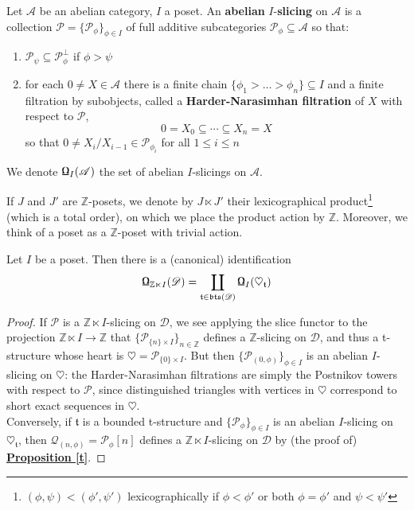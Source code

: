 \begin{defn}
Let $\mathscr{A}$ be an abelian category, $I$ a poset. An \textbf{abelian} $I$-\textbf{slicing} on $\mathscr{A}$ is a collection $\mathscr{P}=\{ \mathscr{P}_{\phi} \}_{\phi \in I}$ of full additive subcategories $\mathscr{P}_{\phi} \subseteq \mathscr{A}$ so that: 
\begin{enumerate}
\item $\mathscr{P}_{\psi} \subseteq \mathscr{P}_{\phi }^{\perp}$ if  $\phi > \psi$
\item for each $0 \not = X \in \mathscr{A}$ there is a finite chain $\{ \phi_1 > \dots > \phi_n \} \subseteq I$ and a finite filtration by subobjects, called a \textbf{Harder-Narasimhan filtration} of $X$ with respect to $\mathscr{P}$, $$0=X_0 \subseteq \cdots \subseteq X_n=X$$ so that $0 \not = X_i / X_{i-1} \in \mathscr{P}_{\phi_i}$ for all $1 \le i \le n$ 
\end{enumerate}
We denote $\textnormal{\Libra}_I(\mathscr{A})$ the set of abelian $I$-slicings on $\mathscr{A}$. 
\end{defn}

If $J$ and $J'$ are $\mathbb{Z}$-posets, we denote by $J \ltimes J'$ their lexicographical product\footnote{$(\phi,\psi) < (\phi',\psi')$ lexicographically if $\phi < \phi'$ or both $\phi=\phi'$ and $\psi < \psi'$} (which is a total order), on which we place the product action by $\mathbb{Z}$. Moreover, we think of a poset as a $\mathbb{Z}$-poset with trivial action.

\begin{prop}\label{v}
Let $I$ be a poset. Then there is a (canonical) identification  $$\textnormal{\Libra}_{\mathbb{Z} \ltimes I}(\mathscr{D})=\coprod_{\mathfrak{t} \in \mathfrak{bts}(\mathscr{D})} \textnormal{\Libra}_I(\heartsuit_{\mathfrak{t}})$$
\end{prop}

\begin{proof}
If $\mathscr{P}$ is a $\mathbb{Z} \ltimes I$-slicing on $\mathscr{D}$, we see applying the slice functor to the projection $\mathbb{Z} \ltimes I \longrightarrow \mathbb{Z}$ that $\{ \mathscr{P}_{ \{ n \} \times I } \}_{n \in \mathbb{Z}}$ defines a $\mathbb{Z}$-slicing on $\mathscr{D}$, and thus a t-structure whose heart is $\heartsuit=\mathscr{P}_{ \{0 \} \times I}$. But then $\{ \mathscr{P}_{(0,\phi)} \}_{\phi \in I}$ is an abelian $I$-slicing on $\heartsuit$: the Harder-Narasimhan filtrations are simply the Postnikov towers with respect to $\mathscr{P}$, since distinguished triangles with vertices in $\heartsuit$ correspond to short exact sequences in $\heartsuit$. \\
Conversely, if $\mathfrak{t}$ is a bounded t-structure and $\{ \mathscr{P}_{\phi} \}_{\phi \in I}$ is an abelian $I$-slicing on $\heartsuit_{\mathfrak{t}}$, then $\mathscr{Q}_{(n,\phi)}=\mathscr{P}_{\phi}[n]$ defines a $\mathbb{Z} \ltimes I$-slicing on $\mathscr{D}$ by (the proof of) \hyperref[t]{\textbf{Proposition \ref*{t}}}.  
\end{proof} 

